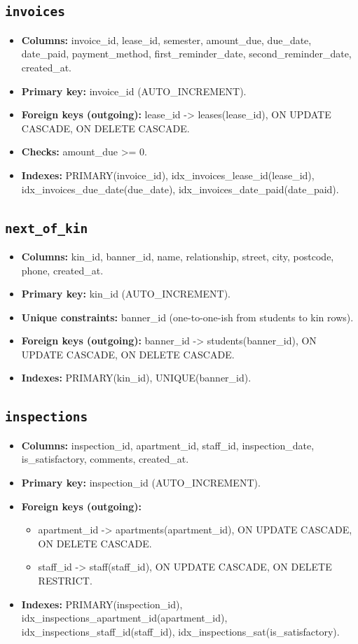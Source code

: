 \documentclass[11pt,a4paper]{article}
\begin{document}
\subsection{\texttt{invoices}}
\begin{itemize}
  \item \textbf{Columns:} invoice\_id, lease\_id, semester, amount\_due, due\_date, date\_paid, payment\_method, first\_reminder\_date, second\_reminder\_date, created\_at.
  \item \textbf{Primary key:} invoice\_id (AUTO\_INCREMENT).
  \item \textbf{Foreign keys (outgoing):} lease\_id -> leases(lease\_id), ON UPDATE CASCADE, ON DELETE CASCADE.
  \item \textbf{Checks:} amount\_due >= 0.
  \item \textbf{Indexes:} PRIMARY(invoice\_id), idx\_invoices\_lease\_id(lease\_id), idx\_invoices\_due\_date(due\_date), idx\_invoices\_date\_paid(date\_paid).
\end{itemize}

\subsection{\texttt{next\_of\_kin}}
\begin{itemize}
  \item \textbf{Columns:} kin\_id, banner\_id, name, relationship, street, city, postcode, phone, created\_at.
  \item \textbf{Primary key:} kin\_id (AUTO\_INCREMENT).
  \item \textbf{Unique constraints:} banner\_id (one-to-one-ish from students to kin rows).
  \item \textbf{Foreign keys (outgoing):} banner\_id -> students(banner\_id), ON UPDATE CASCADE, ON DELETE CASCADE.
  \item \textbf{Indexes:} PRIMARY(kin\_id), UNIQUE(banner\_id).
\end{itemize}

\subsection{\texttt{inspections}}
\begin{itemize}
  \item \textbf{Columns:} inspection\_id, apartment\_id, staff\_id, inspection\_date, is\_satisfactory, comments, created\_at.
  \item \textbf{Primary key:} inspection\_id (AUTO\_INCREMENT).
  \item \textbf{Foreign keys (outgoing):}
  \begin{itemize}
    \item apartment\_id -> apartments(apartment\_id), ON UPDATE CASCADE, ON DELETE CASCADE.
    \item staff\_id -> staff(staff\_id), ON UPDATE CASCADE, ON DELETE RESTRICT.
  \end{itemize}
  \item \textbf{Indexes:} PRIMARY(inspection\_id), idx\_inspections\_apartment\_id(apartment\_id), idx\_inspections\_staff\_id(staff\_id), idx\_inspections\_sat(is\_satisfactory).
\end{itemize}
\end{document}
